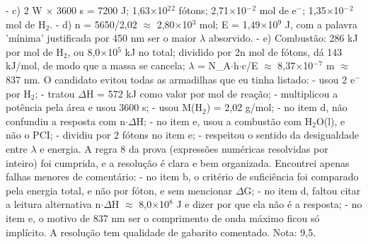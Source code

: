 \documentclass{article}%
\begin{document}
{-} c) 2 W $\times$ 3600 s = 7200 J; 1,63$\times$10$^2$$^2$ fótons; 2,71$\times$10$^{-}$$^2$ mol de e$^{-}$; 1,35$\times$10$^{-}$$^2$ mol de H$_{2}$.\newline%
{-} d) n = 5650/2,02 $\approx$ 2,80$\times$10$^3$ mol; E = 1,49$\times$10$^{9}$ J, com a palavra 'mínima' justificada por 450 nm ser o maior $\lambda$ absorvido.\newline%
{-} e) Combustão: 286 kJ por mol de H$_{2}$, ou 8,0$\times$10$^{5}$ kJ no total; dividido por 2n mol de fótons, dá 143 kJ/mol, de modo que a massa se cancela; $\lambda$ = N\_A$\cdot$h$\cdot$c/E $\approx$ 8,37$\times$10$^{-}$$^{7}$ m $\approx$ 837 nm.\newline%
\newline%
O candidato evitou todas as armadilhas que eu tinha listado:\newline%
{-} usou 2 e$^{-}$ por H$_{2}$;\newline%
{-} tratou $\Delta$H = 572 kJ como valor por mol de reação;\newline%
{-} multiplicou a potência pela área e usou 3600 s;\newline%
{-} usou M(H$_{2}$) = 2,02 g/mol;\newline%
{-} no item d, não confundiu a resposta com n$\cdot$$\Delta$H;\newline%
{-} no item e, usou a combustão com H$_{2}$O(l), e não o PCI;\newline%
{-} dividiu por 2 fótons no item e;\newline%
{-} respeitou o sentido da desigualdade entre $\lambda$ e energia.\newline%
\newline%
A regra 8 da prova (expressões numéricas resolvidas por inteiro) foi cumprida, e a resolução é clara e bem organizada. Encontrei apenas falhas menores de comentário:\newline%
{-} no item b, o critério de suficiência foi comparado pela energia total, e não por fóton, e sem mencionar $\Delta$G;\newline%
{-} no item d, faltou citar a leitura alternativa n$\cdot$$\Delta$H $\approx$ 8,0$\times$10$^{8}$ J e dizer por que ela não é a resposta;\newline%
{-} no item e, o motivo de 837 nm ser o comprimento de onda máximo ficou só implícito.\newline%
\newline%
A resolução tem qualidade de gabarito comentado. Nota: 9,5.%
\end{document}
